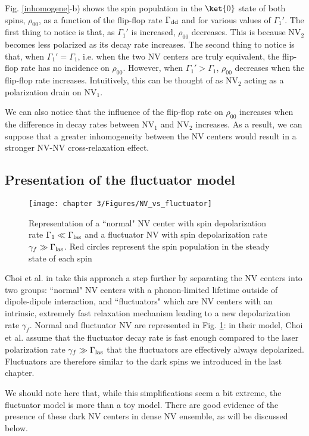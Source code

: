 \documentclass[a4paper, 11pt]{book}
\begin{document}
Fig. \ref{inhomogene}-b) shows the spin population in the $\ket{0}$ state of both spins, $\rho_{00}$, as a function of the flip-flop rate $\Gamma_{\rm dd}$ and for various values of $\Gamma_1'$. The first thing to notice is that, as $\Gamma_1'$ is increased,  $\rho_{00}$ decreases. This is because NV$_2$ becomes less polarized as its decay rate increases. The second thing to notice is that, when $\Gamma_1'=\Gamma_1$, i.e. when the two NV centers are truly equivalent, the flip-flop rate has no incidence on  $\rho_{00}$. However, when $\Gamma_1'>\Gamma_1$,  $\rho_{00}$ decreases when the flip-flop rate increases. Intuitively, this can be thought of as NV$_2$ acting as a polarization drain on NV$_1$. 

We can also notice that the influence of the flip-flop rate on $\rho_{00}$ increases when the difference in decay rates between NV$_1$ and NV$_2$ increases. As a result, we can suppose that a greater inhomogeneity between the NV centers would result in a stronger NV-NV cross-relaxation effect.


\subsection{Presentation of the fluctuator model}
\begin{figure}[h]
\centering
\texttt{[image: chapter 3/Figures/NV\_vs\_fluctuator]}
\caption{Representation of a ``normal" NV center with spin depolarization rate $\Gamma_1 \ll \Gamma_{\rm las}$ and a fluctuator NV with spin depolarization rate $\gamma_f \gg \Gamma_{\rm las}$. Red circles represent the spin population in the steady state of each spin}
\label{NV vs fluct}
\end{figure}
Choi et al. in \citep{choi2017depolarization} take this approach a step further by separating the NV centers into two groups: ``normal" NV centers with a phonon-limited lifetime outside of dipole-dipole interaction, and ``fluctuators" which are NV centers with an intrinsic, extremely fast relaxation mechanism leading to a new depolarization rate $\gamma_f$. Normal and fluctuator NV are represented in Fig. \ref{NV vs fluct}: in their model, Choi et al. assume that the fluctuator decay rate is fast enough compared to the laser polarization rate $\gamma_f \gg \Gamma_{\rm las}$ that the fluctuators are effectively always depolarized. Fluctuators are therefore similar to the dark spins we introduced in the last chapter.

We should note here that, while this simplifications seem a bit extreme, the fluctuator model is more than a toy model. There are good evidence of the presence of these dark NV centers in dense NV ensemble, as will be discussed below.
\end{document}
